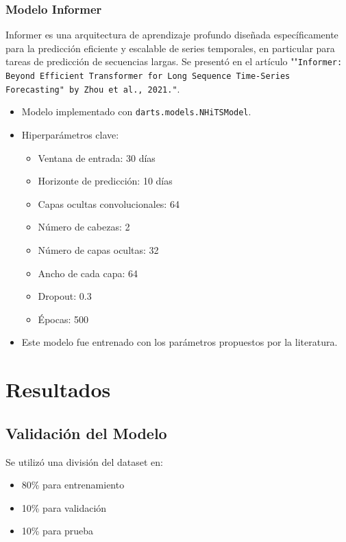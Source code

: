 \documentclass[12pt]{article}
\begin{document}
\subsubsection{Modelo Informer}

Informer es una arquitectura de aprendizaje profundo diseñada específicamente para  la predicción eficiente y escalable de series temporales, en particular para tareas de predicción de secuencias largas. Se presentó en el artículo ""\texttt{Informer: Beyond Efficient Transformer for Long Sequence Time-Series Forecasting" by Zhou et al., 2021."}.


\begin{itemize}
\item Modelo implementado con \texttt{darts.models.NHiTSModel}.
\item Hiperparámetros clave:
\begin{itemize}
\item Ventana de entrada: 30 días
\item Horizonte de predicción: 10 días
\item Capas ocultas convolucionales: 64
\item Número de cabezas: 2
\item Número de capas ocultas: 32
\item Ancho de cada capa: 64
\item Dropout: 0.3
\item Épocas: 500
\end{itemize}
\item Este modelo fue entrenado con los parámetros propuestos por la literatura.
\end{itemize}


\newpage
\section{Resultados}
\label{sec:resultados}

\subsection{Validación del Modelo}

Se utilizó una división del dataset en:
\begin{itemize}
\item 80\% para entrenamiento
\item 10\% para validación
\item 10\% para prueba
\end{itemize}
\end{document}
